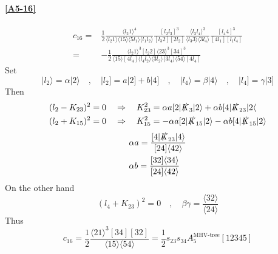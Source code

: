 \paragraph{\ref{A5-16}}
\begin{equation*}
\begin{split}
c_{16} = & \frac{1}{2}
\frac{\langle l_2 1 \rangle^4}{\langle l_2 1 \rangle\langle 15 \rangle\langle 5 l_1 \rangle\langle l_1 l_2\rangle}
\frac{[l_2 l_3]^3}{[l_3 2 ][2 l_2]}
\frac{\langle l_3 l_4\rangle^3}{\langle l_3 3\rangle\langle 3 l_4\rangle}
\frac{[l_4 4 ]^3}{[4l_1][l_1l_4]}
\\
= & 
-\frac{1}{2}\frac{\langle l_2 1\rangle^3[l_2 2 ]\langle 23 \rangle^3[34]^3}{\langle 15 \rangle[4l_4]\langle l_4 l_2\rangle\langle 3l_2\rangle \langle 3 l_4\rangle\langle 54\rangle[4l_4]}
\end{split}
\end{equation*}
Set
\begin{equation*}
|l_2\rangle = \alpha|2\rangle \quad,\quad
|l_2] = a|2] + b|4] \quad,\quad
|l_4\rangle = \beta |4\rangle \quad,\quad
|l_4] = \gamma|3]
\end{equation*}
Then
\begin{equation*}
\begin{split}
& (l_2 - K_{23})^2 = 0 \quad\Rightarrow\quad K_{23}^2 = \alpha a [2|\slashed{K}_3|2\rangle + \alpha b [4|\slashed{K}_{23}|2\langle
\\
& (l_2 + K_{15})^2 = 0 \quad\Rightarrow\quad K_{15}^2 = -\alpha a [2|\slashed{K}_{15}|2\rangle - \alpha b [4|\slashed{K}_{15}|2\rangle
\end{split}
\end{equation*}
\begin{equation*}
\begin{split}
& \alpha a = \frac{[4|\slashed{K}_{23}|4\rangle}{[24]\langle 42\rangle}
\\
& \alpha b = \frac{[32]\langle 34\rangle}{[24]\langle 42\rangle}
\end{split}
\end{equation*}
On the other hand
\begin{equation*}
(l_4 + K_{23})^2 = 0 \quad,\quad \beta\gamma = \frac{\langle 32\rangle}{\langle 24\rangle}
\end{equation*}
Thus
\begin{equation*}
c_{16}= \frac{1}{2}\frac{\langle 21\rangle^3[34][32]}{\langle 15\rangle\langle 54\rangle} = \frac{1}{2}s_{23}s_{34}A_5^{\textrm{MHV-tree}}[12345]
\end{equation*}

















